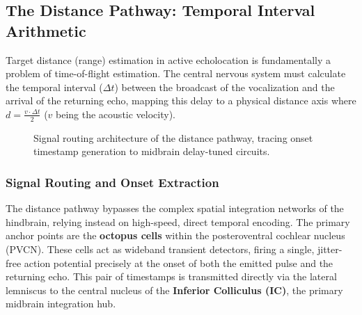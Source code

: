 \subsection{The Distance Pathway: Temporal Interval Arithmetic}
\label{sec:distance_pathway}
Target distance (range) estimation in active echolocation is fundamentally a problem of time-of-flight estimation. The central nervous system must calculate the temporal interval ($\Delta t$) between the broadcast of the vocalization and the arrival of the returning echo, mapping this delay to a physical distance axis where $d = \frac{v \cdot \Delta t}{2}$ ($v$ being the acoustic velocity).

\begin{figure}[htbp]
\centering
{}
\caption{Signal routing architecture of the distance pathway, tracing onset timestamp generation to midbrain delay-tuned circuits.}
\label{fig:tikz_distance_pathway}
\end{figure}

\subsubsection{Signal Routing and Onset Extraction}
The distance pathway bypasses the complex spatial integration networks of the hindbrain, relying instead on high-speed, direct temporal encoding. The primary anchor points are the \textbf{octopus cells} within the posteroventral cochlear nucleus (PVCN). These cells act as wideband transient detectors, firing a single, jitter-free action potential precisely at the onset of both the emitted pulse and the returning echo. This pair of timestamps is transmitted directly via the lateral lemniscus to the central nucleus of the \textbf{Inferior Colliculus (IC)}, the primary midbrain integration hub.

